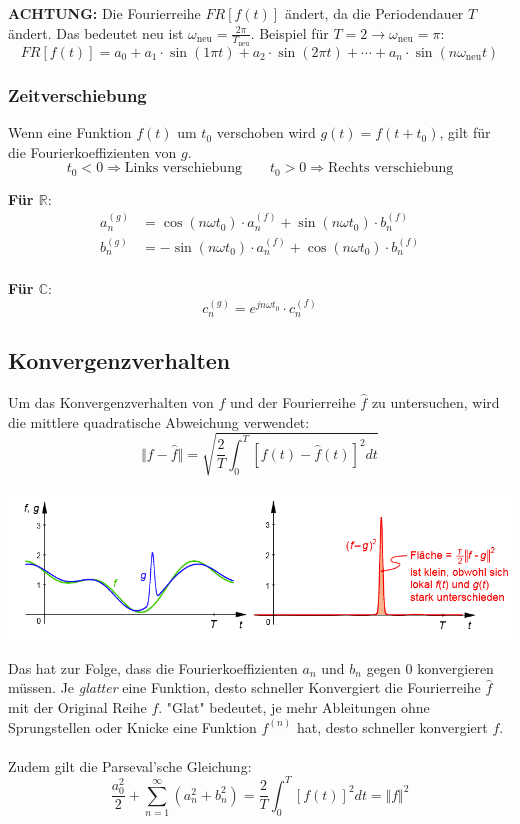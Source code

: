 \noindent\textbf{ACHTUNG:} Die Fourierreihe $FR[f(t)]$ ändert, da die Periodendauer $T$ ändert. Das bedeutet neu ist $\omega_{\text{neu}} = \frac{2\pi}{T_{\text{neu}}}$. Beispiel für $T = 2 \rightarrow \omega_{\text{neu}} = \pi$:
\[
FR[f(t)] = a_0 + a_1\cdot\sin(1\pi t) + a_2\cdot\sin(2\pi t) + \cdots + a_n\cdot\sin(n\omega_{\text{neu}} t)
\]

\subsubsection{Zeitverschiebung}
Wenn eine Funktion $f(t)$ um $t_0$ verschoben wird $g(t) = f(t + t_0)$, gilt für die Fourierkoeffizienten von $g$.
\[
t_0 < 0 \Rightarrow \text{Links verschiebung} \qquad t_0 > 0 \Rightarrow \text{Rechts verschiebung}
\]

\noindent\textbf{Für $\mathbb{R}$}:
\begin{align*}
	a_n^{(g)} &= \cos(n\omega t_0) \cdot a_n^{(f)} + \sin(n\omega t_0) \cdot b_n^{(f)}  \\
	b_n^{(g)} &= -\sin(n\omega t_0) \cdot a_n^{(f)} + \cos(n\omega t_0) \cdot b_n^{(f)}  \\
\end{align*}

\noindent\textbf{Für $\mathbb{C}$}:
\[
c_n^{(g)} = e^{jn\omega t_0} \cdot c_n^{(f)}
\]

\subsection{Konvergenzverhalten}
Um das Konvergenzverhalten von $f$ und der Fourierreihe $\hat{f}$ zu untersuchen, wird die mittlere quadratische Abweichung verwendet:
\[
\Vert f - \hat{f} \Vert = \sqrt{\frac{2}{T}\int_{0}^{T}\left[f(t) - \hat{f}(t)\right]^2dt}
\]
\begin{center}
	\includegraphics[width=\columnwidth]{Images/konvergenz}
\end{center}

\noindent Das hat zur Folge, dass die Fourierkoeffizienten $a_n$ und $b_n$ gegen $0$ konvergieren müssen. Je \textit{glatter} eine Funktion, desto schneller Konvergiert die Fourierreihe $\hat{f}$ mit der Original Reihe $f$. "Glat" bedeutet, je mehr Ableitungen ohne Sprungstellen oder Knicke eine Funktion $f^{(n)}$ hat, desto schneller konvergiert $f$.
~\\
\noindent Zudem gilt die Parseval'sche Gleichung:
\[
\frac{a_0^2}{2} + \sum\limits_{n=1}^{\infty}\left(a_n^2 + b_n^2\right) = \frac{2}{T}\int_{0}^{T}[f(t)]^2dt = \Vert f \Vert^2
\]
